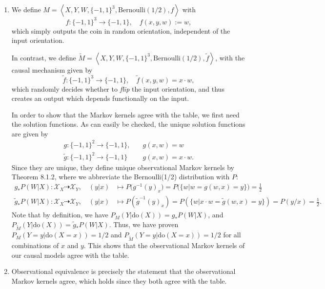 \begin{enumerate}
	\begin{ungradedsolution}
		\begin{enumerate}
			\item We define $M = \left\langle X, Y, W, \{-1,1\}^3, \text{Bernoulli}(1/2), f \right\rangle$ with
			\begin{equation*}
				f: \{-1,1\}^3 \to \{-1,1\}, \quad f(x, y, w) := w,
			\end{equation*}
			which simply outputs the coin in random orientation, independent of the input orientation.

			In contrast, we define $\tilde{M} = \left\langle X, Y, W, \{-1,1\}^3, \text{Bernoulli}(1/2), \tilde{f} \right\rangle$, with the causal mechanism given by
			\begin{equation*}
				\tilde{f}: \{-1,1\}^3 \to \{-1,1\}, \quad \tilde{f}(x, y, w) = x \cdot w,
			\end{equation*}
			which randomly decides whether to \emph{flip} the input orientation, and thus creates an output which depends functionally on the input.

			In order to show that the Markov kernels agree with the table, we first need the solution functions.
			As can easily be checked, the unique solution functions are given by
			\begin{align*}
				g: \{-1,1\}^2 \to \{-1,1\},        & \quad g(x, w) = w          \\
				\tilde{g}: \{-1,1\}^2 \to \{-1,1\} & \quad g(x, w) = x \cdot w.
			\end{align*}
			Since they are unique, they define unique observational Markov kernels by Theorem 8.1.2, where we abbreviate the Bernoulli(1/2) distribution with $P$:
			\begin{align*}
				g_{*}P(W | X): \mathcal{X}_X \dashrightarrow \mathcal{X}_Y, \quad (y | x)         & \mapsto P\big(g^{-1}(y)_x\big) = P\big(\{w | w = g(w,x) = y\}\big) = \frac{1}{2}                                                      \\
				\tilde{g}_{*}P(W | X): \mathcal{X}_X \dashrightarrow \mathcal{X}_Y, \quad (y | x) & \mapsto P\left(\tilde{g}^{-1}(y)_x\right) = P\left(\{w | x \cdot w = \tilde{g}(w, x) = y \}\right) = P\left(y/x\right) = \frac{1}{2}.
			\end{align*}
			Note that by definition, we have $P_{M}(Y | \text{do}(X)) = g_{*}P(W | X)$, and $P_{\tilde{M}}(Y | \text{do}(X)) = \tilde{g}_{*}P(W | X)$.
			Thus, we have proven $P_{M}(Y = y | \text{do}(X = x)) = 1/2$ and $P_{\tilde{M}}(Y = y | \text{do}(X = x)) = 1/2$ for all combinations of $x$ and $y$.
			This shows that the observational Markov kernels of our causal models agree with the table.
			\item Observational equivalence is precisely the statement that the observational Markov kernels agree, which holds since they both agree with the table.


\end{enumerate}
\end{ungradedsolution}
\end{enumerate}
